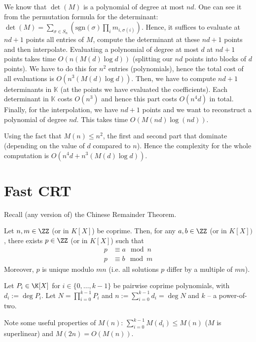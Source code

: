 \documentclass[11pt]{exam}
\theoremstyle{definition}
\begin{document}
{\begin{solution}
	We know that $\det(M)$ is a polynomial of degree at most $nd$. One can see it from the permutation formula for the determinant: $\det(M) =\sum_{\sigma \in S_n} ( \text{sgn}(\sigma) \prod_i m_{i, \sigma(i)}) $. Hence, it suffices to evaluate at $nd+1$ points all entries of $M$, compute the determinant at these $nd+1$ points and then interpolate.
	Evaluating a polynomial of degree at most $d$ at $nd+1$ points takes time $O(n(M(d)\log d))$ (splitting our $nd$ points into blocks of $d$ points). We have to do this for $n^2$ entries (polynomials), hence the total cost of all evaluations is $O(n^3(M(d)\log d))$.
	Then, we have to compute $nd+1$ determinants in $\mathbb{K}$ (at the points we have evaluated the coefficients). Each determinant in $\mathbb{K}$ costs $O(n^3)$ and hence this part costs $O(n^4d)$ in total.
	Finally, for the interpolation, we have $nd+1$ points and we want to reconstruct a polynomial of degree $nd$. This takes time $O(M(nd) \log(nd))$.
	
	Using the fact that $M(n) \leq n^2$, the first and second part that dominate (depending on the value of $d$ compared to $n$). Hence the complexity for the whole computation is $O(n^4d+n^3(M(d)\log d))$.
\end{solution}

\section{Fast CRT}
\label{CRT}

\begin{questions}
	\question Recall (any version of) the Chinese Remainder Theorem.
	
	\begin{solution}
	Let $n, m \in \ZZ$ (or in $K[X]$) be coprime. Then, for any $a,b \in \ZZ$ (or in $K[X])$, there exists $p \in \ZZ$ (or in $K[X]$) such that 
	\begin{align*}
	p &\equiv a \mod n \\
	p &\equiv b \mod m
	\end{align*}
	Moreover, $p$ is unique modulo $mn$ (i.e. all solutions $p$ differ by a multiple of $mn$).
	\end{solution}


Let $P_i \in \K[X]$ for $i \in \{0,\ldots, k-1\}$ be pairwise coprime polynomials,
with $d_i := \deg P_i$. Let $N = \prod_{i=0}^{k-1} P_i$ and $n :=
\sum_{i=0}^{k-1} d_i = \deg N$ and $k$ -- a power-of-two. 

Note some useful properties of $M(n)$: $\sum_{i=0}^{k-1} M(d_i) \leq M(n)$ ($M$ is superlinear) and  $M(2n)=O(M(n))$.


\end{questions}}
\end{document}
